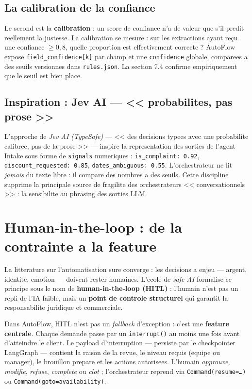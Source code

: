 \documentclass[12pt,a4paper,openany]{report}
\begin{document}
\subsection{La calibration de la confiance}
Le second est la \textbf{calibration} : un score de confiance n'a de valeur que s'il predit reellement la justesse. La calibration se mesure : sur les extractions ayant re\c cu une confiance $\geq 0{,}8$, quelle proportion est effectivement correcte ? AutoFlow expose \texttt{field\_confidence[k]} par champ et une \texttt{confidence} globale, comparees a des seuils versionnes dans \texttt{rules.json}. La section 7.4 confirme empiriquement que le seuil est bien place.

\subsection{Inspiration : Jev AI --- << probabilites, pas prose >>}
L'approche de \emph{Jev AI (TypeSafe)} --- << des decisions typees avec une probabilite calibree, pas de la prose >> --- inspire la representation des sorties de l'agent Intake sous forme de \texttt{signals} numeriques : \texttt{is\_complaint: 0.92}, \texttt{discount\_requested: 0.85}, \texttt{dates\_ambiguous: 0.55}. L'orchestrateur ne lit \emph{jamais} du texte libre : il compare des nombres a des seuils. Cette discipline supprime la principale source de fragilite des orchestrateurs << conversationnels >> : la sensibilite au phrasing des sorties LLM.

\section{Human-in-the-loop : de la contrainte a la feature}

La litterature sur l'automatisation sure converge : les decisions a enjeu --- argent, identite, emotion --- doivent rester humaines. L'ecole de \emph{safe AI} formalise ce principe sous le nom de \textbf{human-in-the-loop (HITL)} : l'humain n'est pas un repli de l'IA faible, mais un \textbf{point de controle structurel} qui garantit la responsabilite juridique et commerciale.

Dans AutoFlow, HITL n'est pas un \emph{fallback} d'exception : c'est une \textbf{feature centrale}. Chaque demande passe par un \texttt{interrupt()} au moins une fois avant d'atteindre le client. Le payload d'interruption --- persiste par le checkpointer LangGraph --- contient la raison de la revue, le niveau requis (equipe ou manager), le brouillon prepare et les actions autorisees. L'humain \emph{approuve}, \emph{modifie}, \emph{refuse}, \emph{complete} ou \emph{clot} ; l'orchestrateur reprend via \texttt{Command(resume=\dots)} ou \texttt{Command(goto=availability)}.
\end{document}
